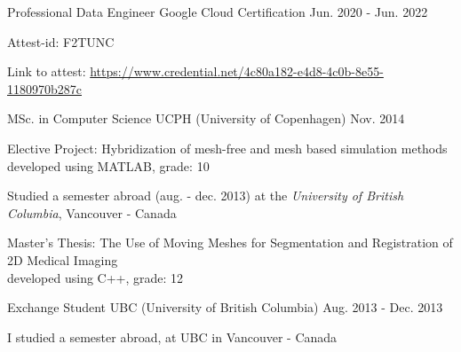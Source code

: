
% 

\begin{cventries}


\cventry
{Professional Data Engineer} %
{Google Cloud Certification} %
{} %
{Jun. 2020 - Jun. 2022} %
{ %
\begin{cvitems}
	\item {Attest-id: F2TUNC}
	\item {Link to attest: \href{https://www.credential.net/4c80a182-e4d8-4c0b-8e55-1180970b287c}{https://www.credential.net/4c80a182-e4d8-4c0b-8e55-1180970b287c}}
\end{cvitems}
}


\cventry
{MSc. in Computer Science} %
{UCPH (University of Copenhagen)} %
{} %
{Nov. 2014} %
{ %
\begin{cvitems}
\item {Elective Project: Hybridization of mesh-free and mesh based simulation methods\\
		\phantom{x}\scriptsize{developed using MATLAB, grade: 10}}
\item {Studied a semester abroad (aug. - dec. 2013) at the \textit{University of British Columbia}, Vancouver - Canada}
\item {Master's Thesis: The Use of Moving Meshes for Segmentation and Registration of 2D Medical Imaging\\
		\phantom{x}\scriptsize{developed using C++, grade: 12}}
\end{cvitems}
}

\cventry
{Exchange Student} %
{UBC (University of British Columbia)} %
{} %
{Aug. 2013 - Dec. 2013} %
{ %
\begin{cvitems}
\item {I studied a semester abroad, at UBC in Vancouver - Canada}
\end{cvitems}
}


\end{cventries}
